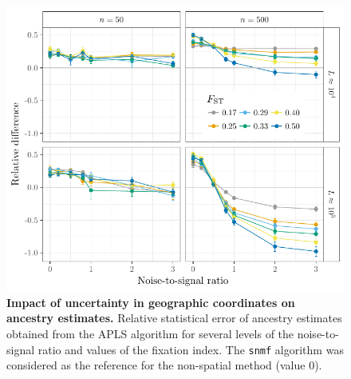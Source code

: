 \begin{figure}
  \centering
  \includegraphics[width=\textwidth]{./Figures/figure2_5.pdf}
  \caption{{\bf Impact of uncertainty in geographic coordinates on ancestry
      estimates.} Relative statistical error of ancestry estimates obtained
    from the APLS algorithm for several levels of the noise-to-signal ratio and
    values of the fixation index. The {\tt snmf} algorithm was
    considered as the reference for the non-spatial method (value 0).}
  \label{fig:fig2_5}
\end{figure}  

\clearpage 
\newpage



